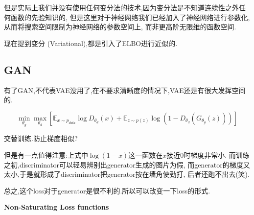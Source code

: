 	但是实际上我们并没有使用任何变分法的技术,因为变分法是不知道连续性之外任何函数的先验知识的,
	但是这里对于神经网络我们已经加入了神经网络进行参数化,从而将搜索空间限制为神经网络的参数空间上,
	而非更高阶无限维的函数空间.

	现在提到变分 (Variational),都是引入了ELBO进行近似的.

	\subsection{GAN}

	有了GAN,不代表VAE没用了,在不要求清晰度的情况下,VAE还是有很大发挥空间的.
	
	\begin{equation}
		\min _{\theta_{g}} \max _{\theta_{d}}\left[\mathbb{E}_{x \sim p_{d a t a}} \log D_{\theta_{d}}(x)+\mathbb{E}_{z \sim p(z)} \log \left(1-D_{\theta_{d}}\left(G_{\theta_{g}}(z)\right)\right)\right]
	\end{equation}

	交替训练.防止梯度相似?
	
	
	但是有一点值得注意:上式中$\log(1-x)$这一函数在$x$接近$0$时梯度非常小.
	而训练之初,discriminator可以轻易辨别出generator生成的图片为假,
	而generator的梯度又太小,于是就形成了discriminator把generator按在墙角使劲打,
	后者还跑不出去(笑).
	
	总之,这个loss对于generator是很不利的.所以可以改变一下loss的形式.
	
	\textbf{Non-Saturating Loss functions}
	
